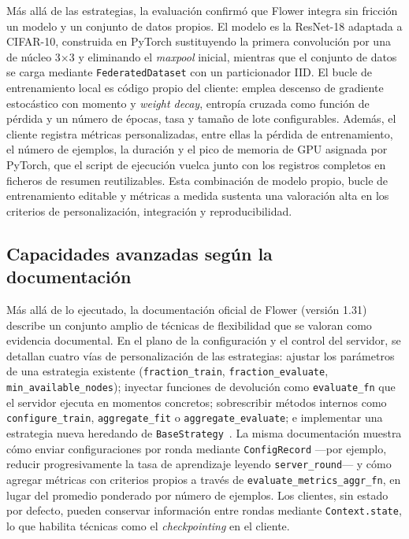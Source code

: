 Más allá de las estrategias, la evaluación confirmó que Flower integra sin
fricción un modelo y un conjunto de datos propios. El modelo es la ResNet-18
adaptada a CIFAR-10, construida en PyTorch sustituyendo la primera convolución por
una de núcleo 3$\times$3 y eliminando el \textit{maxpool} inicial, mientras que el
conjunto de datos se carga mediante \texttt{FederatedDataset} con un
particionador IID. El bucle de entrenamiento local es código propio del cliente:
emplea descenso de gradiente estocástico con momento y \textit{weight decay},
entropía cruzada como función de pérdida y un número de épocas, tasa y tamaño de
lote configurables. Además, el cliente registra métricas personalizadas, entre
ellas la pérdida de entrenamiento, el número de ejemplos, la duración y el pico de
memoria de GPU asignada por PyTorch, que el script de ejecución vuelca junto con
los registros completos en ficheros de resumen reutilizables. Esta combinación de
modelo propio, bucle de entrenamiento editable y métricas a medida sustenta una
valoración alta en los criterios de personalización, integración y
reproducibilidad.

\subsection{Capacidades avanzadas según la documentación}\label{subsec:flex-flower-doc}

Más allá de lo ejecutado, la documentación oficial de Flower (versión 1.31) describe
un conjunto amplio de técnicas de flexibilidad que se valoran como evidencia
documental. En el plano de la configuración y el control del servidor, se detallan
cuatro vías de personalización de las estrategias: ajustar los parámetros de una
estrategia existente (\texttt{fraction\_train}, \texttt{fraction\_evaluate},
\texttt{min\_available\_nodes}); inyectar funciones de devolución como
\texttt{evaluate\_fn} que el servidor ejecuta en momentos concretos; sobrescribir
métodos internos como \texttt{configure\_train}, \texttt{aggregate\_fit} o
\texttt{aggregate\_evaluate}; e implementar una estrategia nueva heredando de
\texttt{BaseStrategy}~\parencite{beutel2020flower}. La misma documentación muestra cómo
enviar configuraciones por ronda mediante \texttt{ConfigRecord} —por ejemplo, reducir
progresivamente la tasa de aprendizaje leyendo \texttt{server\_round}— y cómo agregar
métricas con criterios propios a través de \texttt{evaluate\_metrics\_aggr\_fn}, en
lugar del promedio ponderado por número de ejemplos. Los clientes, sin estado por
defecto, pueden conservar información entre rondas mediante \texttt{Context.state}, lo
que habilita técnicas como el \textit{checkpointing} en el cliente.

